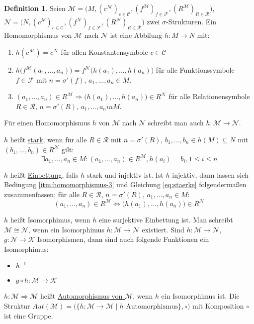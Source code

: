\documentclass{article}
\theoremstyle{definition}
\newtheorem{dfn}{Definition}[section]
\theoremstyle{plain}
\newcommand{\m}[1]{\mathcal{#1}}
\newcommand{\struc}[3]{\big(#1, (c^{#2})_{c \in \m{C}_{#3}}, (f^{#2})_{f \in \m{F}_{#3}}, (R^{#2})_{R \in \m{R}_{#3}}\big)}
\begin{document}
    \begin{dfn}
        Seien $ \m{M} = \struc{M}{\m{M}}{} $, $ \m{N} = \struc{N}{\m{N}}{} $ zwei $ \sigma $-Strukturen.
        Ein Homomorphismus von $ \m{M} $ nach $ \m{N} $ ist eine Abbilung $ h : M \rightarrow N $ mit:
        \begin{enumerate}
            \item $ h(c^\m{M}) = c^\m{N} $ für allen Konstantensymbole $ c \in \m{C} $
            \item $ h\big(f^\m{M}(a_1, ..., a_n)\big) = f^\m{N}\big(h(a_1), ..., h(a_n)\big) $ für alle Funktionssymbole $ f \in \m{F} $ mit $ n = \sigma'(f) $, $ a_1, ..., a_n \in M $.
            \item \label{itm:homomorphismus-3} $ (a_1, ..., a_n) \in R^\m{M} \Rightarrow \big(h(a_1), ..., h(a_n)) \in R^\m{N} $ für alle Relationensymbole $ R \in \m{R} $, $ n = \sigma'(R) $, $ a_1, ..., a_n in M $.
        \end{enumerate}

            Für einen Homomorphismus $ h $ von $ \m{M} $ nach $ \m{N} $ schreibt man auch $ h : \m{M} \rightarrow \m{N} $.

            $ h $ heißt \underline{stark}, wenn für alle $ R \in \m{R} $ mit $ n = \sigma'(R) $, $ b_1, ..., b_n \in h(M) \subseteq N $ mit $ (b_1, ..., b_n) \in R^\m{N} $ gilt:
            \begin{equation}
                \label{eq:staerke}
                \exists a_1, ..., a_n \in M : (a_1, ..., a_n) \in R^\m{M}, h(a_i) = b_i, 1 \leq i \leq n
            \end{equation}

            $ h $ heißt \underline{Einbettung}, falls $ h $ stark und injektiv ist.
            Ist $ h $ injektiv, dann lassen sich Bedingung \ref{itm:homomorphismus-3} und Gleichung \eqref{eq:staerke} folgendermaßen zusammenfassen; für alle $ R \in \m{R} $, $ n = \sigma'(R) $, $ a_1, ..., a_n \in M $:
            \begin{equation}
                (a_1, ..., a_n) \in R^\m{M} \Leftrightarrow \big(h(a_1), ..., h(a_n)\big) \in R^\m{N}
            \end{equation}

            $ h $ heißt Isomorphimus, wenn $ h $ eine surjektive Einbettung ist.
            Man schreibt $ \m{M} \cong \m{N} $, wenn ein Isomorphimus $ h : \m{M} \rightarrow \m{N} $ existiert.
            Sind $ h : \m{M} \rightarrow \m{N} $, $ g : \m{N} \rightarrow \m{K} $ Isomorphismen, dann sind auch folgende Funktionen ein Isomorphimus:
            \begin{itemize}
                \item $ h^{-1} $
                \item $ g \circ h : \m{M} \rightarrow \m{K} $
            \end{itemize}

            $ h : \m{M} \Rightarrow \m{M} $ heißt \underline{Automorphismus von $ \m{M} $}, wenn $ h $ ein Isomorphimus ist.
            Die Struktur $ Aut(\m{M}) = \big( \{ h : \m{M} \rightarrow \m{M} \mid h \text{ Automorphismus} \}, \circ \big) $ mit Komposition $ \circ $ ist eine Gruppe.
    \end{dfn}
\end{document}
